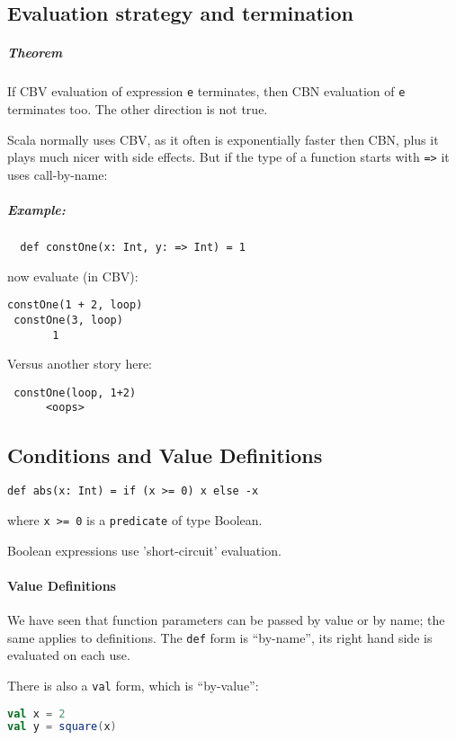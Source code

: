 \documentclass{scrartcl}
\newcommand{\example}{\subparagraph{Example:}} %
\newcommand{\term}[1]{\verb~#1~} %
\newcommand{\video}[1]{} %
\begin{document}
\subsection{Evaluation strategy and termination}
\label{sec:evalStrategy}

\subparagraph{Theorem} If CBV evaluation of expression \term e terminates, then
CBN evaluation of \term e terminates too. The other direction is not true.

Scala normally uses CBV, as it often is exponentially faster then CBN, plus it
plays much nicer with side effects. But if the type of a function starts with
\verb!=>! it uses call-by-name:

\example
\begin{lstlisting}
  def constOne(x: Int, y: => Int) = 1
\end{lstlisting}
now evaluate (in CBV):
\begin{lstlisting}
constOne(1 + 2, loop)
 constOne(3, loop)
       1
\end{lstlisting}
Versus another story here:
\begin{lstlisting}
 constOne(loop, 1+2)
      <oops>
\end{lstlisting}
\video{2-4}

\subsection{Conditions and Value Definitions}
\label{sec:CondAndValueDefs}

\begin{lstlisting}
def abs(x: Int) = if (x >= 0) x else -x
\end{lstlisting}
where \lstinline|x >= 0| is a \term{predicate} of type Boolean.

Boolean expressions use 'short-circuit' evaluation.

\paragraph{Value Definitions}

We have seen that function parameters can be passed by value or by name; the
same applies to definitions. The \lstinline|def| form is ``by-name'', its right
hand side is evaluated on each use.

There is also a \lstinline|val| form, which is ``by-value'':
\begin{lstlisting}[language=scala]
val x = 2
val y = square(x)
\end{lstlisting}
\end{document}
